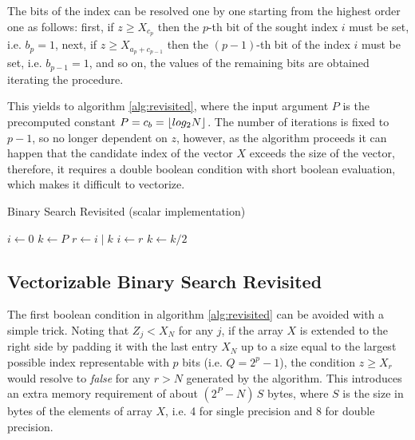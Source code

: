 \documentclass[preprint,1p,times]{elsarticle}
\begin{document}
The bits of the index can be resolved one by one starting from the highest order one as follows:
first, if $z \geq X_{c_p}$ then the $p$-th bit of the sought index $i$ must be set, i.e. $b_p=1$, 
next, if $z \geq X_{a_p+c_{p-1}}$ then the $(p-1)$-th bit of the index $i$ must be set, i.e. $b_{p-1}=1$, 
and so on, the values of the remaining bits are obtained iterating the procedure.

This yields to algorithm \ref{alg:revisited}, where the input argument $P$ is the precomputed constant $P=c_b=\left \lfloor  log_2 N  \right \rfloor$. The number of iterations is fixed to $p-1$, so no longer dependent on $z$, however, 
as the algorithm proceeds it can happen that the candidate index of the vector $X$ exceeds the
size of the vector, therefore, it requires a double boolean condition with short boolean evaluation, 
which makes it difficult to vectorize.

\begin{algorithm}[h]
\caption{Binary Search Revisited (scalar implementation)}
\label{alg:revisited}
\begin{algorithmic}
 
\State $i \leftarrow 0$
\State $k \leftarrow P$
\Repeat
    \State $r \leftarrow i\;|\;k$ 
     
        \State $i \leftarrow r$
    \EndIf
	\State $k \leftarrow k / 2$ 
\EndFunction
\end{algorithmic}
\end{algorithm}

\subsection{Vectorizable Binary Search Revisited}
The first boolean condition in algorithm \ref{alg:revisited} can be avoided with a simple trick.
Noting that $Z_j<X_N$ for any $j$, if the array $X$ is extended to the right side by padding 
it with the last entry $X_N$ up to a size equal to the largest possible index representable with $p$ bits (i.e. $Q=2^p-1$), the condition $z \geq X_{r}$ would resolve to \textit{false} for any $r>N$ generated by the algorithm. 
This introduces an extra memory requirement of about $(2^P-N)\,S$ bytes, where $S$ is the size in bytes of the elements of array $X$, i.e. 4 for single precision and 8 for double precision.
\end{document}

